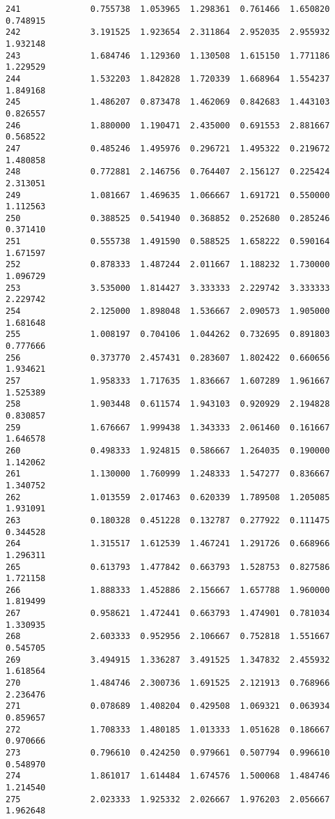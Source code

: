 \documentclass[11pt]{article}
\begin{document}
\begin{Verbatim}[commandchars=\\\{\}]
241              0.755738  1.053965  1.298361  0.761466  1.650820  0.748915
242              3.191525  1.923654  2.311864  2.952035  2.955932  1.932148
243              1.684746  1.129360  1.130508  1.615150  1.771186  1.229529
244              1.532203  1.842828  1.720339  1.668964  1.554237  1.849168
245              1.486207  0.873478  1.462069  0.842683  1.443103  0.826557
246              1.880000  1.190471  2.435000  0.691553  2.881667  0.568522
247              0.485246  1.495976  0.296721  1.495322  0.219672  1.480858
248              0.772881  2.146756  0.764407  2.156127  0.225424  2.313051
249              1.081667  1.469635  1.066667  1.691721  0.550000  1.112563
250              0.388525  0.541940  0.368852  0.252680  0.285246  0.371410
251              0.555738  1.491590  0.588525  1.658222  0.590164  1.671597
252              0.878333  1.487244  2.011667  1.188232  1.730000  1.096729
253              3.535000  1.814427  3.333333  2.229742  3.333333  2.229742
254              2.125000  1.898048  1.536667  2.090573  1.905000  1.681648
255              1.008197  0.704106  1.044262  0.732695  0.891803  0.777666
256              0.373770  2.457431  0.283607  1.802422  0.660656  1.934621
257              1.958333  1.717635  1.836667  1.607289  1.961667  1.525389
258              1.903448  0.611574  1.943103  0.920929  2.194828  0.830857
259              1.676667  1.999438  1.343333  2.061460  0.161667  1.646578
260              0.498333  1.924815  0.586667  1.264035  0.190000  1.142062
261              1.130000  1.760999  1.248333  1.547277  0.836667  1.340752
262              1.013559  2.017463  0.620339  1.789508  1.205085  1.931091
263              0.180328  0.451228  0.132787  0.277922  0.111475  0.344528
264              1.315517  1.612539  1.467241  1.291726  0.668966  1.296311
265              0.613793  1.477842  0.663793  1.528753  0.827586  1.721158
266              1.888333  1.452886  2.156667  1.657788  1.960000  1.819499
267              0.958621  1.472441  0.663793  1.474901  0.781034  1.330935
268              2.603333  0.952956  2.106667  0.752818  1.551667  0.545705
269              3.494915  1.336287  3.491525  1.347832  2.455932  1.618564
270              1.484746  2.300736  1.691525  2.121913  0.768966  2.236476
271              0.078689  1.408204  0.429508  1.069321  0.063934  0.859657
272              1.708333  1.480185  1.013333  1.051628  0.186667  0.970666
273              0.796610  0.424250  0.979661  0.507794  0.996610  0.548970
274              1.861017  1.614484  1.674576  1.500068  1.484746  1.214540
275              2.023333  1.925332  2.026667  1.976203  2.056667  1.962648

\end{Verbatim}
\end{document}
